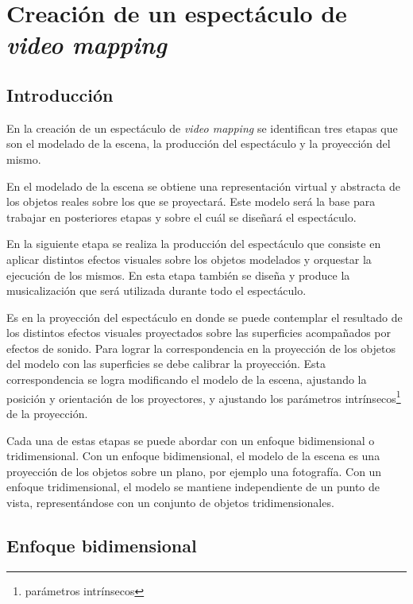 \chapter{Creación de un espectáculo de \emph{video mapping}}

\section{Introducción}
En la creación de un espectáculo de \emph{video mapping} se identifican tres etapas que son el modelado de la escena, la producción del espectáculo y la proyección del mismo.

En el modelado de la escena se obtiene una representación virtual y abstracta de los objetos reales sobre los que se proyectará. Este modelo será la base para trabajar en posteriores etapas y sobre el cuál se diseñará el espectáculo.

En la siguiente etapa se realiza la producción del espectáculo que consiste en aplicar distintos efectos visuales sobre los objetos modelados y orquestar la ejecución de los mismos. En esta etapa también se diseña y produce la musicalización que será utilizada durante todo el espectáculo.

Es en la proyección del espectáculo en donde se puede contemplar el resultado de los distintos efectos visuales proyectados sobre las superficies acompañados por efectos de sonido.
Para lograr la correspondencia en la proyección de los objetos del modelo con las superficies se debe calibrar la proyección. Esta correspondencia se logra modificando el modelo de la escena, ajustando la posición y orientación de los proyectores, y ajustando los parámetros intrínsecos\footnote{parámetros intrínsecos} de la proyección.

Cada una de estas etapas se puede abordar con un enfoque bidimensional o tridimensional.
Con un enfoque bidimensional, el modelo de la escena es una proyección de los objetos sobre un plano, por ejemplo una fotografía. Con un enfoque tridimensional, el modelo se mantiene independiente de un punto de vista, representándose con un conjunto de objetos tridimensionales.


\section{Enfoque bidimensional}
